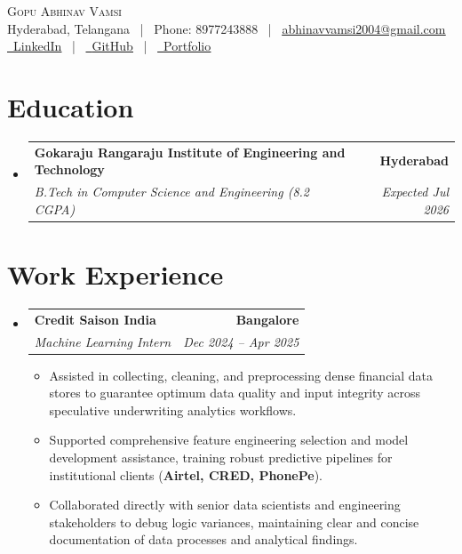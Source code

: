 \documentclass[letterpaper,11pt]{article}
\makeatletter
\newcommand{\resumeItem}[1]{
  \item\small{
    {#1 \vspace{-3pt}}
  }
}
\newcommand{\resumeSubheading}[4]{
  \vspace{-3pt}\item
    \begin{tabular*}{1.0\textwidth}[t]{l@{\extracolsep{\fill}}r}
      \textbf{#1} & \textbf{\small #2} \\
      \textit{\small#3} & \textit{\small #4} \\
    \end{tabular*}\vspace{-7pt}
}
\newcommand{\resumeSubHeadingListStart}{\begin{itemize}[leftmargin=0.0in, label={}]}
\newcommand{\resumeSubHeadingListEnd}{\end{itemize}}
\newcommand{\resumeItemListStart}{\begin{itemize}}
\newcommand{\resumeItemListEnd}{\end{itemize}\vspace{0pt}}
\makeatother
\begin{document}
    \begin{center}
        {\Huge\scshape Gopu Abhinav Vamsi} \\ \vspace{2pt}
        Hyderabad, Telangana ~|~ Phone: 8977243888 ~|~ \href{mailto:abhinavvamsi2004@gmail.com}{\underline{abhinavvamsi2004@gmail.com}} \\ \vspace{2pt}
        \small
        \href{https://www.linkedin.com/in/gopu-abhinav-vamsi-0211ab294/}{\faLinkedin\ \underline{LinkedIn}} ~|~
        \href{https://github.com/Abhinavvamsi}{\faGithub\ \underline{GitHub}} ~|~
        \href{https://abhinavvamsi.github.io/abhinav-portfolio/}{\faGlobe\ \underline{Portfolio}}
    \end{center}

\section{Education}
  \resumeSubHeadingListStart
    \resumeSubheading
      {Gokaraju Rangaraju Institute of Engineering and Technology}{Hyderabad}
      {B.Tech in Computer Science and Engineering (8.2 CGPA)}{Expected Jul 2026}
  \resumeSubHeadingListEnd

\section{Work Experience}
  \resumeSubHeadingListStart
    \resumeSubheading
      {Credit Saison India}{Bangalore}
      {Machine Learning Intern}{Dec 2024 -- Apr 2025}
      \resumeItemListStart
        \resumeItem{Assisted in collecting, cleaning, and preprocessing dense financial data stores to guarantee optimum data quality and input integrity across speculative underwriting analytics workflows.}
        \resumeItem{Supported comprehensive feature engineering selection and model development assistance, training robust predictive pipelines for institutional clients (\textbf{Airtel, CRED, PhonePe}).}
        \resumeItem{Collaborated directly with senior data scientists and engineering stakeholders to debug logic variances, maintaining clear and concise documentation of data processes and analytical findings.}
      \resumeItemListEnd
  \resumeSubHeadingListEnd

\end{document}
